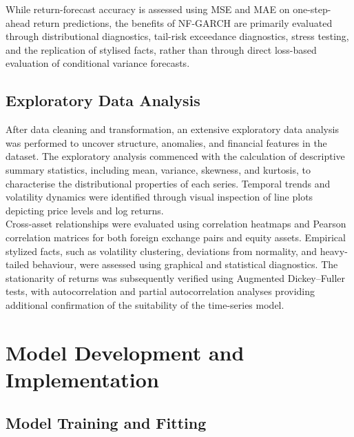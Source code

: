 \documentclass[oneside,12pt]{CUEDthesisPSnPDF}
\begin{document}
While return-forecast accuracy is assessed using MSE and MAE on one-step-ahead return predictions, the benefits of NF-GARCH are primarily evaluated through distributional diagnostics, tail-risk exceedance diagnostics, stress testing, and the replication of stylised facts, rather than through direct loss-based evaluation of conditional variance forecasts.\\


\subsection{Exploratory Data Analysis}
\noindent 
After data cleaning and transformation, an extensive exploratory data analysis was performed to uncover structure, anomalies, and financial features in the dataset. The exploratory analysis commenced with the calculation of descriptive summary statistics, including mean, variance, skewness, and kurtosis, to characterise the distributional properties of each series. Temporal trends and volatility dynamics were identified through visual inspection of line plots depicting price levels and log returns. \\

Cross-asset relationships were evaluated using correlation heatmaps and Pearson correlation matrices for both foreign exchange pairs and equity assets. Empirical stylized facts, such as volatility clustering, deviations from normality, and heavy-tailed behaviour, were assessed using graphical and statistical diagnostics. The stationarity of returns was subsequently verified using Augmented Dickey–Fuller tests, with autocorrelation and partial autocorrelation analyses providing additional confirmation of the suitability of the time-series model.\\


\section{Model Development and Implementation} 

\subsection{Model Training and Fitting}
\end{document}
